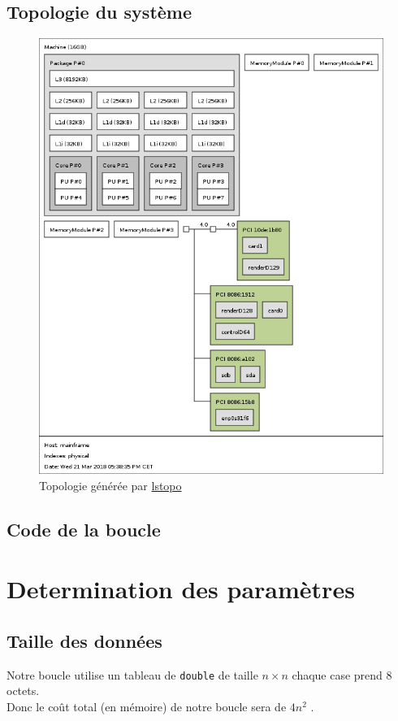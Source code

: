 \documentclass{report}
\begin{document}
  \subsection{Topologie du système}
    \begin{figure}[ht!]
      \centering
      \includegraphics[scale=0.35]{resources/lstopo.png}
      \caption{Topologie générée par \href{https://manpages.debian.org/jessie/hwloc/lstopo.1.en.html}{lstopo}}
    \end{figure}
  \newpage
  \subsection{Code de la boucle}
    
\section{Determination des paramètres}
  \subsection{Taille des données}
    Notre boucle utilise un tableau de \texttt{double} de taille $n\times n$
    chaque case prend 8 octets. \\
    Donc le coût total (en mémoire) de notre boucle sera de $4n^2$ . \\
\end{document}
